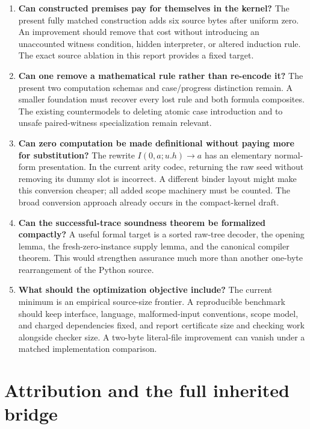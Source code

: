 \documentclass[11pt,letterpaper]{article}
\theoremstyle{definition}\newtheorem{definition}[theorem]{Definition}
\theoremstyle{remark}\newtheorem{remark}[theorem]{Remark}
\begin{document}
\begin{enumerate}
\item \textbf{Can constructed premises pay for themselves in the kernel?}
The present fully matched construction adds six source bytes after uniform
zero. An improvement should remove that cost without introducing an
unaccounted witness condition, hidden interpreter, or altered induction rule.
The exact source ablation in this report provides a fixed target.

\item \textbf{Can one remove a mathematical rule rather than re-encode it?}
The present two computation schemas and case/progress distinction remain.
A smaller foundation must recover every lost rule and both formula
composites. The existing countermodels to deleting atomic case introduction
and to unsafe paired-witness specialization remain relevant.

\item \textbf{Can zero computation be made definitional without paying more
for substitution?} The rewrite $I(0,a;u.h)\to a$ has an elementary normal-form
presentation. In the current arity codec, returning the raw seed without
removing its dummy slot is incorrect. A different binder layout might
make this conversion cheaper; all added scope machinery must be counted.
The broad conversion approach already occurs in the compact-kernel draft.

\item \textbf{Can the successful-trace soundness theorem be formalized
compactly?} A useful formal target is a sorted raw-tree decoder, the
opening lemma, the fresh-zero-instance supply lemma, and the canonical
compiler theorem. This would strengthen assurance much more than another
one-byte rearrangement of the Python source.

\item \textbf{What should the optimization objective include?} The current
minimum is an empirical source-size frontier. A reproducible benchmark
should keep interface, language, malformed-input conventions, scope model,
and charged dependencies fixed, and report certificate size and checking
work alongside checker size. A two-byte literal-file improvement can vanish
under a matched implementation comparison.
\end{enumerate}

\appendix
\clearpage
\section*{Attribution and the full inherited bridge}
\end{document}
